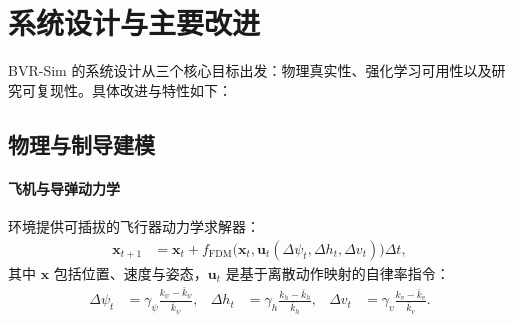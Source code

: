 \documentclass[11pt,a4paper]{article}
\begin{document}



\section{系统设计与主要改进}

BVR-Sim 的系统设计从三个核心目标出发：物理真实性、强化学习可用性以及研究可复现性。具体改进与特性如下：

\subsection{物理与制导建模}

\paragraph{飞机与导弹动力学}
环境提供可插拔的飞行器动力学求解器：
\begin{align}
\mathbf{x}_{t+1} &= \mathbf{x}_t + f_{\text{FDM}}\big(\mathbf{x}_t, \mathbf{u}_t(\Delta\psi_t,\Delta h_t,\Delta v_t)\big)\Delta t,
\end{align}
其中 $\mathbf{x}$ 包括位置、速度与姿态，$\mathbf{u}_t$ 是基于离散动作映射的自律率指令：
\begin{align}
\Delta \psi_t &= \gamma_\psi \frac{k_\psi-\bar{k}_\psi}{\bar{k}_\psi}, &
\Delta h_t &= \gamma_h \frac{k_h-\bar{k}_h}{\bar{k}_h}, &
\Delta v_t &= \gamma_v \frac{k_v-\bar{k}_v}{\bar{k}_v}.
\end{align}
\end{document}
